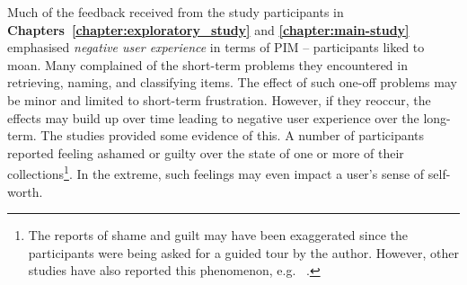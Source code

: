 Much of the feedback received from the study participants in \textbf{Chapters~\ref{chapter:exploratory_study}} and \textbf{\ref{chapter:main-study}} emphasised \textit{negative user experience} in terms of PIM -- participants liked to moan.  Many complained of the short-term problems they encountered in retrieving, naming, and classifying items. %
The effect of such one-off problems may be minor and limited to short-term frustration.  However, if they reoccur, the effects may build up over time leading to negative user experience over the long-term.   %
The studies provided some evidence of this.  A number of participants reported feeling ashamed or guilty over the state of one or more of their collections\footnote{The reports of shame and guilt may have been exaggerated since the participants were being asked for a guided tour by the author.  However, other studies have also reported this phenomenon, e.g. ~\citep{Bellotti:00}.}.  In the extreme, such feelings may even impact a user's sense of self-worth.





